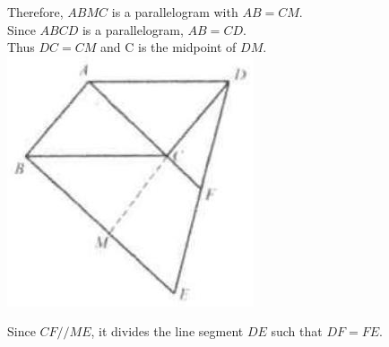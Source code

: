 \documentclass{article}
\begin{document}
Therefore, \(A B M C\) is a parallelogram with \(A B=C M\).\\
Since \(A B C D\) is a parallelogram, \(A B=C D\).\\
Thus \(D C=C M\) and C is the midpoint of \(D M\).\\
\centering
\includegraphics[width=\textwidth]{images/reasoning_image_1.jpg}

Since \(C F / / M E\), it divides the line segment \(D E\) such that \(D F=F E\).\\
\end{document}
